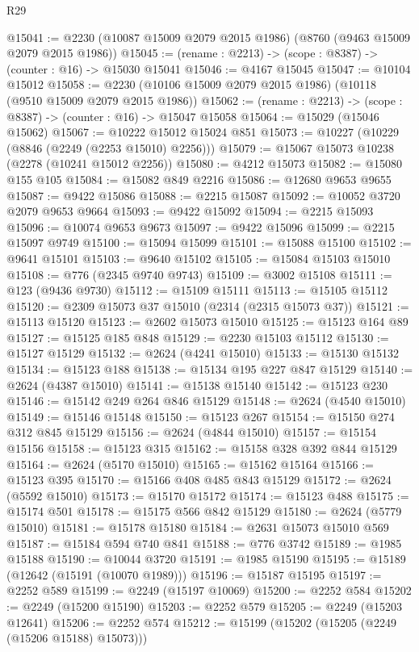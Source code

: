\begin{lexlean}{R29}
\begin{coremodule}
@15041 := @2230 (@10087 @15009 @2079 @2015 @1986) (@8760 (@9463 @15009 @2079 @2015 @1986))
@15045 := (rename : @2213) -> (scope : @8387) -> (counter : @16) -> @15030 @15041
@15046 := @4167 @15045
@15047 := @10104 @15012
@15058 := @2230 (@10106 @15009 @2079 @2015 @1986) (@10118 (@9510 @15009 @2079 @2015 @1986))
@15062 := (rename : @2213) -> (scope : @8387) -> (counter : @16) -> @15047 @15058
@15064 := @15029 (@15046 @15062)
@15067 := @10222 @15012 @15024 @851
@15073 := @10227 (@10229 (@8846 (@2249 (@2253 @15010) @2256)))
@15079 := @15067 @15073 @10238 (@2278 (@10241 @15012 @2256))
@15080 := @4212 @15073
@15082 := @15080 @155 @105
@15084 := @15082 @849 @2216
@15086 := @12680 @9653 @9655
@15087 := @9422 @15086
@15088 := @2215 @15087
@15092 := @10052 @3720 @2079 @9653 @9664
@15093 := @9422 @15092
@15094 := @2215 @15093
@15096 := @10074 @9653 @9673
@15097 := @9422 @15096
@15099 := @2215 @15097 @9749
@15100 := @15094 @15099
@15101 := @15088 @15100
@15102 := @9641 @15101
@15103 := @9640 @15102
@15105 := @15084 @15103 @15010
@15108 := @776 (@2345 @9740 @9743)
@15109 := @3002 @15108
@15111 := @123 (@9436 @9730)
@15112 := @15109 @15111
@15113 := @15105 @15112
@15120 := @2309 @15073 @37 @15010 (@2314 (@2315 @15073 @37))
@15121 := @15113 @15120
@15123 := @2602 @15073 @15010
@15125 := @15123 @164 @89
@15127 := @15125 @185 @848
@15129 := @2230 @15103 @15112
@15130 := @15127 @15129
@15132 := @2624 (@4241 @15010)
@15133 := @15130 @15132
@15134 := @15123 @188
@15138 := @15134 @195 @227 @847 @15129
@15140 := @2624 (@4387 @15010)
@15141 := @15138 @15140
@15142 := @15123 @230
@15146 := @15142 @249 @264 @846 @15129
@15148 := @2624 (@4540 @15010)
@15149 := @15146 @15148
@15150 := @15123 @267
@15154 := @15150 @274 @312 @845 @15129
@15156 := @2624 (@4844 @15010)
@15157 := @15154 @15156
@15158 := @15123 @315
@15162 := @15158 @328 @392 @844 @15129
@15164 := @2624 (@5170 @15010)
@15165 := @15162 @15164
@15166 := @15123 @395
@15170 := @15166 @408 @485 @843 @15129
@15172 := @2624 (@5592 @15010)
@15173 := @15170 @15172
@15174 := @15123 @488
@15175 := @15174 @501
@15178 := @15175 @566 @842 @15129
@15180 := @2624 (@5779 @15010)
@15181 := @15178 @15180
@15184 := @2631 @15073 @15010 @569
@15187 := @15184 @594 @740 @841
@15188 := @776 @3742
@15189 := @1985 @15188
@15190 := @10044 @3720
@15191 := @1985 @15190
@15195 := @15189 (@12642 (@15191 (@10070 @1989)))
@15196 := @15187 @15195
@15197 := @2252 @589
@15199 := @2249 (@15197 @10069)
@15200 := @2252 @584
@15202 := @2249 (@15200 @15190)
@15203 := @2252 @579
@15205 := @2249 (@15203 @12641)
@15206 := @2252 @574
@15212 := @15199 (@15202 (@15205 (@2249 (@15206 @15188) @15073)))

\end{coremodule}
\end{lexlean}
